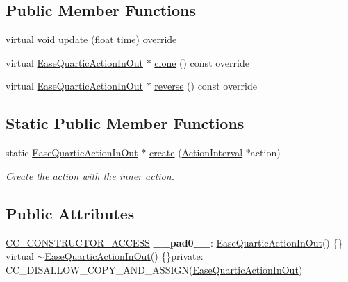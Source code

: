 \subsection*{Public Member Functions}
\begin{DoxyCompactItemize}
\item 
virtual void \hyperlink{classEaseQuarticActionInOut_a331f286f05a385660f6bff75d5665178}{update} (float time) override
\item 
virtual \hyperlink{classEaseQuarticActionInOut}{Ease\+Quartic\+Action\+In\+Out} $\ast$ \hyperlink{classEaseQuarticActionInOut_a5f29576edb9028cb7c4461eea1030085}{clone} () const override
\item 
virtual \hyperlink{classEaseQuarticActionInOut}{Ease\+Quartic\+Action\+In\+Out} $\ast$ \hyperlink{classEaseQuarticActionInOut_a71b1f0c1807a96a6c1c6903810357d68}{reverse} () const override
\end{DoxyCompactItemize}
\subsection*{Static Public Member Functions}
\begin{DoxyCompactItemize}
\item 
static \hyperlink{classEaseQuarticActionInOut}{Ease\+Quartic\+Action\+In\+Out} $\ast$ \hyperlink{classEaseQuarticActionInOut_af30609efe28ad03b11dc8e54dc297d1b}{create} (\hyperlink{classActionInterval}{Action\+Interval} $\ast$action)
\begin{DoxyCompactList}\small\item\em Create the action with the inner action. \end{DoxyCompactList}\end{DoxyCompactItemize}
\subsection*{Public Attributes}
\begin{DoxyCompactItemize}
\item 
\mbox{\label{classEaseQuarticActionInOut_a01d056670c2f0efe5303050799025616}} 
\hyperlink{_2cocos2d_2cocos_2base_2ccConfig_8h_a25ef1314f97c35a2ed3d029b0ead6da0}{C\+C\+\_\+\+C\+O\+N\+S\+T\+R\+U\+C\+T\+O\+R\+\_\+\+A\+C\+C\+E\+SS} {\bfseries \+\_\+\+\_\+pad0\+\_\+\+\_\+}\+: \hyperlink{classEaseQuarticActionInOut}{Ease\+Quartic\+Action\+In\+Out}() \{\} virtual $\sim$\hyperlink{classEaseQuarticActionInOut}{Ease\+Quartic\+Action\+In\+Out}() \{\}private\+: C\+C\+\_\+\+D\+I\+S\+A\+L\+L\+O\+W\+\_\+\+C\+O\+P\+Y\+\_\+\+A\+N\+D\+\_\+\+A\+S\+S\+I\+GN(\hyperlink{classEaseQuarticActionInOut}{Ease\+Quartic\+Action\+In\+Out})
\end{DoxyCompactItemize}
